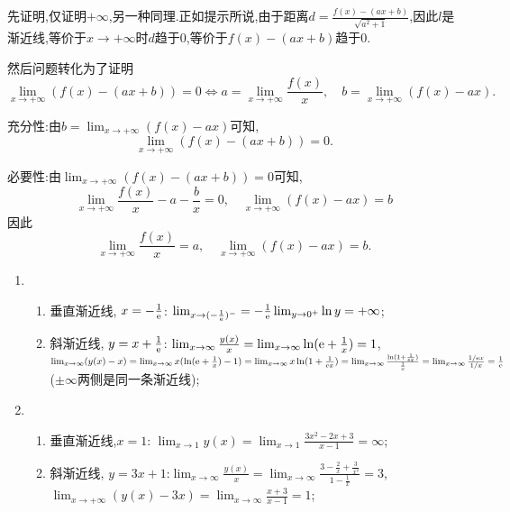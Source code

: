 \begin{solution}
    先证明,仅证明$+\infty$,另一种同理.正如提示所说,由于距离$d=\frac{f(x)-(ax+b)}{\sqrt{a^2+1}}$,因此$l$是渐近线,等价于$x\to+\infty$时$d$趋于$0$,等价于$f(x)-(ax+b)$趋于$0$.
    
    然后问题转化为了证明$$\lim_{x \to +\infty} (f(x) - (ax+b)) = 0 \Leftrightarrow a = \lim_{x \to +\infty} \frac{f(x)}{x}, \quad b = \lim_{x \to +\infty} (f(x)-ax).$$

    充分性:由$b = \lim_{x \to +\infty} (f(x)-ax)$可知,$$\lim_{x \to +\infty} (f(x) - (ax+b)) = 0.$$

    必要性:由$\lim_{x \to +\infty} (f(x) - (ax+b)) = 0$可知,$$\lim_{x \to +\infty} \frac{f(x)}{x} - a - \frac{b}{x} = 0, \quad \lim_{x \to +\infty} (f(x)-ax) = b$$因此$$\lim_{x \to +\infty} \frac{f(x)}{x} = a, \quad \lim_{x \to +\infty} (f(x)-ax) = b.$$



    \begin{enumerate}[(1)]
        \item
              \begin{enumerate}
                  \item 垂直渐近线, $x=- \frac{1}{\mathrm{e}}$: $\lim_{x \to (-\frac{1}{\mathrm{e}})^-} = -\frac{1}{\mathrm{e}} \lim_{y \to 0^+} \ln y = +\infty$;
                  \item 斜渐近线, $y=x + \frac{1}{\mathrm{e}}$: $\lim_{x \to \infty} \frac{y(x)}{x} = \lim_{x \to \infty} \ln(\mathrm{e} + \frac{1}{x}) = 1$, $\lim_{x \to  \infty} (y(x) - x) = \lim_{x \to \infty} x(\ln(\mathrm{e} + \frac{1}{x}) - 1) = \lim_{x \to \infty} x\ln(1 + \frac{1}{\mathrm{e} x}) = \lim_{x \to \infty} \frac{\ln(1 + \frac{1}{\mathrm{e} x})}{\frac{1}{x}} = \lim_{x \to  \infty} \frac{1 / \mathrm{e} x}{1 / x} = \frac{1}{\mathrm{e}}$($\pm\infty$两侧是同一条渐近线);
              \end{enumerate}
        \item
              \begin{enumerate}
                  \item 垂直渐近线,$x=1$: $\lim_{x \to 1} y(x) = \lim_{x \to 1} \frac{3x^2 - 2x + 3}{x-1} = \infty$;
                  \item 斜渐近线, $y=3x+1$:$\lim_{x \to \infty} \frac{y(x)}{x} = \lim_{x \to  \infty} \frac{3 - \frac{2}{x} + \frac{3}{x^2}}{1 - \frac{1}{x}} = 3$, $\lim_{x \to + \infty} (y(x) - 3x) = \lim_{x \to \infty} \frac{x+3}{x-1} = 1$;
              \end{enumerate}
    \end{enumerate}
\end{solution}

